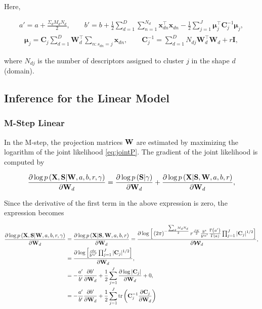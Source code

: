 	Here,
	
	\begin{align}
	a'=a+{\frac{\Sigma_d M_d N_d}{2}}, \quad \quad b'=b+{\frac{1}{2}}\sum\limits_{d=1}^{D}\sum\limits_{n=1}^{N_d}{\mathbf{x}_{dn}^{\top}\mathbf{x}_{dn}}-{\frac{1}{2}}\sum\limits_{j=1}^{J}\boldsymbol{\mu}_j^\top \mathbf{C}_j^{-1}\boldsymbol{\mu}_j,
	\end{align}
	\begin{align}
	\boldsymbol{\mu}_j =\mathbf{C}_j\sum\limits_{d=1}^{D}{\mathbf{W}_d^\top\sum\limits_{n:s_{dn}=j}{\mathbf{x}_{dn}}}, \quad \quad \mathbf{C}_{j}^{-1} =\sum\limits_{d=1}^{D}{N_{dj}\mathbf{W}_d^\top\mathbf{W}_d+r\mathbf{I}},
	\end{align}
	
	where $N_{dj}$ is the number of descriptors assigned to cluster $j$ in the shape $d$ (domain). 
	
	\subsection{Inference for the Linear Model}
	
	\subsubsection{M-Step Linear}
	
	In the M-step, the projection matrices $\mathbf{W}$ are estimated by maximizing the logarithm of the joint likelihood \eqref{eq:jointP}. The gradient of the joint likelihood is computed by
	
	\begin{align}
	\frac{\partial \log p\left(\mathbf{X},\mathbf{S}|\mathbf{W},a,b,r,\gamma\right)}{\partial\mathbf{W}_d} =
	\frac{\partial \log p\left(\mathbf{S}|\gamma\right)}{\partial\mathbf{W}_d} + \frac{\partial \log p\left(\mathbf{X}|\mathbf{S},\boldsymbol{\mathbf{W}},a,b,r\right)}{\partial\mathbf{W}_d},
	\end{align}
	
	Since the derivative of the first term in the above expression is zero, the expression becomes
	
	\begin{align}
	\frac{\partial \log p\left(\mathbf{X},\mathbf{S}|\mathbf{W},a,b,r,\gamma\right)}{\partial\mathbf{W}_d} &=
	\frac{\partial \log p\left(\mathbf{X}|\mathbf{S},\mathbf{W},a,b,r\right)}{\partial\mathbf{W}_d} = \frac{\partial \log \Big[\left(2\pi\right)^{-\frac{\sum_d M_d N_d}{2}}r^{\frac{JK}{2}}\frac{b^{a}}{b'^{a'}}\frac{\Gamma\left(a'\right)}{\Gamma\left(a\right)}\prod_{j=1}^{J}|\mathbf{C}_j|^{1/2}\Big]}{\partial\boldsymbol{\mathcal{W}}_d},\notag\\
	&= \frac{\partial \log \Big[\frac{cte}{b'^{a'}} \prod_{j=1}^{J}|\mathbf{C}_j|^{1/2}\Big]}{\partial\mathbf{W}_d}\notag,\\
	& = -\frac{a'}{b'}\frac{\partial b'}{\partial\mathbf{W}_d}+\frac{1}{2}\sum_{j=1}^{J}\frac{\partial \log |\mathbf{C}_j|}{\partial\mathbf{W}_d}+0 , \notag \\
	& =  -\frac{a'}{b'}\frac{\partial b'}{\partial\mathbf{W}_d}+\frac{1}{2}\sum_{j=1}^{J} \operatorname{tr}\left(\mathbf{C}_j^{-1}\frac{\partial \mathbf{C}_j}{\partial\mathbf{W}_d}\right)
	\end{align}
	
